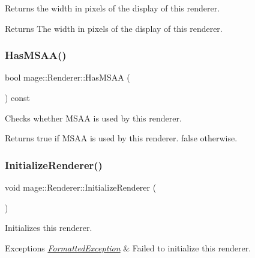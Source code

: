 Returns the width in pixels of the display of this renderer.

\begin{DoxyReturn}{Returns}
The width in pixels of the display of this renderer. 
\end{DoxyReturn}
\hypertarget{classmage_1_1_renderer_a2ed9e9e39f01fa58769edd82ee1adcf8}{}\label{classmage_1_1_renderer_a2ed9e9e39f01fa58769edd82ee1adcf8} 
\subsubsection{\texorpdfstring{Has\+M\+S\+A\+A()}{HasMSAA()}}
{\footnotesize\ttfamily bool mage\+::\+Renderer\+::\+Has\+M\+S\+AA (\begin{DoxyParamCaption}{ }\end{DoxyParamCaption}) const\hspace{0.3cm}{\ttfamily [noexcept]}}

Checks whether M\+S\+AA is used by this renderer.

\begin{DoxyReturn}{Returns}
{\ttfamily true} if M\+S\+AA is used by this renderer. {\ttfamily false} otherwise. 
\end{DoxyReturn}
\hypertarget{classmage_1_1_renderer_a2bb7f4e41ef6db047ce3023ed4e5d0c1}{}\label{classmage_1_1_renderer_a2bb7f4e41ef6db047ce3023ed4e5d0c1} 
\subsubsection{\texorpdfstring{Initialize\+Renderer()}{InitializeRenderer()}}
{\footnotesize\ttfamily void mage\+::\+Renderer\+::\+Initialize\+Renderer (\begin{DoxyParamCaption}{ }\end{DoxyParamCaption})\hspace{0.3cm}{\ttfamily [private]}}

Initializes this renderer.


\begin{DoxyExceptions}{Exceptions}
{\em \hyperlink{structmage_1_1_formatted_exception}{Formatted\+Exception}} & Failed to initialize this renderer. \\
\hline
\end{DoxyExceptions}
\hypertarget{classmage_1_1_renderer_a5ae3220e19c68f47a8e4d55e3ced4694}{}\label{classmage_1_1_renderer_a5ae3220e19c68f47a8e4d55e3ced4694} 
